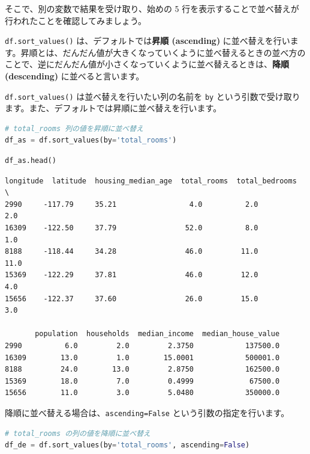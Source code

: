 そこで、別の変数で結果を受け取り、始めの 5 行を表示することで並べ替えが行われたことを確認してみましょう。


\texttt{df.sort\_values()} は、デフォルトでは\textbf{昇順 (ascending)} に並べ替えを行います。昇順とは、だんだん値が大きくなっていくように並べ替えるときの並べ方のことで、逆にだんだん値が小さくなっていくように並べ替えるときは、\textbf{降順 (descending)} に並べると言います。


\texttt{df.sort\_values()} は並べ替えを行いたい列の名前を \texttt{by} という引数で受け取ります。また、デフォルトでは昇順に並べ替えを行います。


\begin{lstlisting}[style=codecell,language=Python]
# total_rooms 列の値を昇順に並べ替え
df_as = df.sort_values(by='total_rooms')
\end{lstlisting}

\begin{lstlisting}[style=codecell,language=Python]
df_as.head()
\end{lstlisting}

\begin{lstlisting}[style=outputcell]
       longitude  latitude  housing_median_age  total_rooms  total_bedrooms  \
2990     -117.79     35.21                 4.0          2.0             2.0   
16309    -122.50     37.79                52.0          8.0             1.0   
8188     -118.44     34.28                46.0         11.0            11.0   
15369    -122.29     37.81                46.0         12.0             4.0   
15656    -122.37     37.60                26.0         15.0             3.0   

       population  households  median_income  median_house_value  
2990          6.0         2.0         2.3750            137500.0  
16309        13.0         1.0        15.0001            500001.0  
8188         24.0        13.0         2.8750            162500.0  
15369        18.0         7.0         0.4999             67500.0  
15656        11.0         3.0         5.0480            350000.0  
\end{lstlisting}

降順に並べ替える場合は、\texttt{ascending=False} という引数の指定を行います。


\begin{lstlisting}[style=codecell,language=Python]
# total_rooms の列の値を降順に並べ替え
df_de = df.sort_values(by='total_rooms', ascending=False)
\end{lstlisting}

